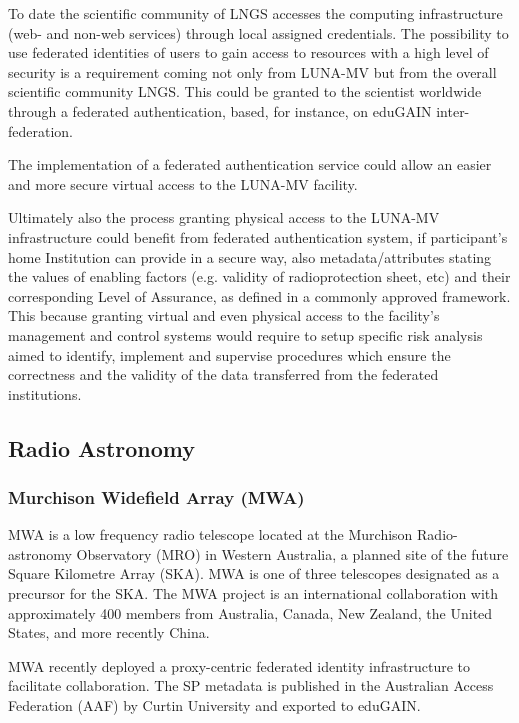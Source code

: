 \documentclass[fleqn,11pt]{wlscirep}
\begin{document}
{To date the scientific community of LNGS accesses the computing infrastructure (web- and non-web services) through local assigned credentials. The possibility to use federated identities of users to gain access to resources with a high level of security is a requirement coming not only from LUNA-MV but from the overall scientific community LNGS. This could be granted to the scientist worldwide through a federated authentication, based, for instance, on eduGAIN inter-federation.

The implementation of a federated authentication service could allow an easier and more secure virtual access to the LUNA-MV facility. 

Ultimately also the process granting physical access to the LUNA-MV infrastructure could benefit from federated authentication system, if participant’s home  Institution can provide in a secure way, also metadata/attributes stating the values of enabling factors (e.g. validity of radioprotection sheet, etc) and their corresponding Level of Assurance, as defined in a commonly approved framework. This because granting virtual and even physical access to the facility's management and control systems would require to setup specific risk analysis aimed to identify, implement and supervise procedures which ensure the correctness and the validity of the data transferred from the federated institutions.

\subsection{Radio Astronomy}

\subsubsection{Murchison Widefield Array (MWA)}
MWA is a low frequency radio telescope located at the Murchison Radio-astronomy Observatory (MRO) in Western Australia, a planned site of the future Square Kilometre Array (SKA). MWA is one of three telescopes designated as a precursor for the SKA. The MWA project is an international collaboration with approximately 400 members from Australia, Canada, New Zealand, the United States, and more recently China.

MWA recently deployed a proxy-centric federated identity infrastructure to facilitate collaboration. The SP metadata is published in the Australian Access Federation (AAF) by Curtin University and exported to eduGAIN. 

}
\end{document}
